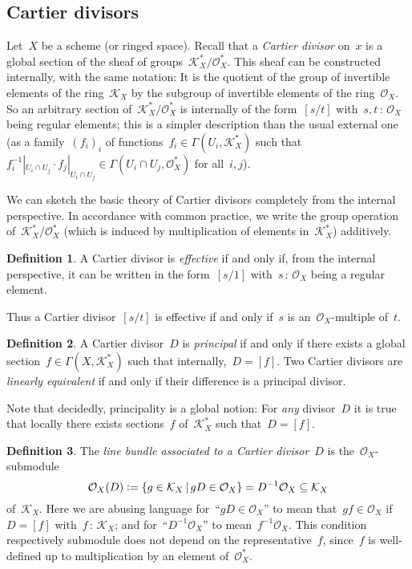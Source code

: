 \documentclass[10pt]{amsart}
\theoremstyle{definition}
\newtheorem{defn}{Definition}[section]
\theoremstyle{plain}
\theoremstyle{remark}
\renewcommand{\O}{\mathcal{O}}
\newcommand{\K}{\mathcal{K}}
\newcommand{\?}{\,{:}\,}
\renewcommand{\_}{\mathpunct{.}\,}
\newcommand{\defeq}{\vcentcolon=}
\begin{document}
\subsection{Cartier divisors} Let~$X$ be a scheme (or ringed space). Recall
that a \emph{Cartier divisor} on~$x$ is a global section of the sheaf of
groups~$\K_X^* / \O_X^*$. This sheaf can be constructed internally, with the
same notation: It is the quotient of the group of invertible elements of the
ring~$\K_X$ by the subgroup of invertible elements of the ring~$\O_X$. So an
arbitrary section of~$\K_X^*/\O_X^*$ is internally of the form~$[s/t]$
with~$s,t\?\O_X$ being regular elements; this is a simpler description than the
usual external one (as a family~$(f_i)_i$ of functions~$f_i \in
\Gamma(U_i,\K_X^*)$ such that~$f_i^{-1}|_{U_i \cap U_j} \cdot f_j|_{U_i \cap
U_j} \in \Gamma(U_i \cap U_j, \O_X^*)$ for all~$i,j$).

We can sketch the basic theory of Cartier divisors completely from the internal
perspective. In accordance with common practice, we write the group
operation of~$\K_X^*/\O_X^*$ (which is induced by multiplication of elements
in~$\K_X^*$) additively.

\begin{defn}\label{defn:effective-cartier-divisor}
A Cartier divisor is \emph{effective} if and only if, from the
internal perspective, it can be written in the form~$[s/1]$ with~$s\?\O_X$
being a regular element.\end{defn}

Thus a Cartier divisor~$[s/t]$ is effective if and only if~$s$ is
an~$\O_X$-multiple of~$t$.

\begin{defn}A Cartier divisor~$D$ is \emph{principal} if and only if there
exists a global section~$f \in \Gamma(X,\K_X^*)$ such that internally,~$D = [f]$.
Two Cartier divisors are \emph{linearly equivalent} if and only if their
difference is a principal divisor.
\end{defn}

Note that decidedly, principality is a global notion: For \emph{any} divisor~$D$ it is
true that locally there exists sections~$f$ of~$\K_X^*$ such that~$D = [f]$.

\begin{defn}\label{defn:line-bundle-of-divisor}
The \emph{line bundle associated to a Cartier divisor}~$D$
is the~$\O_X$-submodule
\[ \O_X(D) \defeq \{ g \in \K_X \,|\, g D \in \O_X \} = D^{-1} \O_X \subseteq \K_X
\]
of~$\K_X$. Here we are abusing language for~``$gD \in \O_X$'' to mean that~$gf
\in \O_X$ if~$D = [f]$ with~$f\?\K_X$; and for~``$D^{-1} \O_X$'' to
mean~$f^{-1}\O_X$. This condition respectively submodule does not depend on the
representative~$f$, since~$f$ is well-defined up to multiplication by an element
of~$\O_X^*$.\end{defn}
\end{document}
